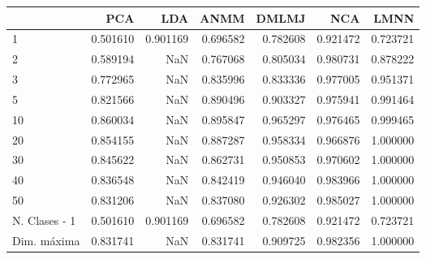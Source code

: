\begin{tabular}{lrrrrrr}
\toprule
{} &       PCA &       LDA &      ANMM &     DMLMJ &       NCA &      LMNN \\
\midrule
1             &  0.501610 &  0.901169 &  0.696582 &  0.782608 &  0.921472 &  0.723721 \\
2             &  0.589194 &       NaN &  0.767068 &  0.805034 &  0.980731 &  0.878222 \\
3             &  0.772965 &       NaN &  0.835996 &  0.833336 &  0.977005 &  0.951371 \\
5             &  0.821566 &       NaN &  0.890496 &  0.903327 &  0.975941 &  0.991464 \\
10            &  0.860034 &       NaN &  0.895847 &  0.965297 &  0.976465 &  0.999465 \\
20            &  0.854155 &       NaN &  0.887287 &  0.958334 &  0.966876 &  1.000000 \\
30            &  0.845622 &       NaN &  0.862731 &  0.950853 &  0.970602 &  1.000000 \\
40            &  0.836548 &       NaN &  0.842419 &  0.946040 &  0.983966 &  1.000000 \\
50            &  0.831206 &       NaN &  0.837080 &  0.926302 &  0.985027 &  1.000000 \\
N. Clases - 1 &  0.501610 &  0.901169 &  0.696582 &  0.782608 &  0.921472 &  0.723721 \\
Dim. máxima   &  0.831741 &       NaN &  0.831741 &  0.909725 &  0.982356 &  1.000000 \\
\bottomrule
\end{tabular}
